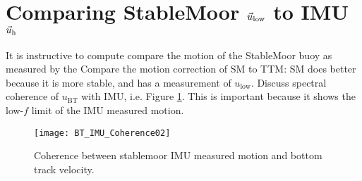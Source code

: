 \section{Comparing StableMoor $\vec{u}_\mathrm{low}$ to IMU $\vec{u}_\mathrm{h}$}
\label{apdx:ulow}

It is instructive to compute compare the motion of the StableMoor buoy as measured by the Compare the motion correction of SM to TTM: SM does better because it is more stable, and has a measurement of $u_\mathrm{low}$. Discuss spectral coherence of $u_\mathrm{BT}$ with IMU, i.e. Figure \ref{fig:SM_coh}. This is important because it shows the low-$f$ limit of the IMU measured motion.

\begin{figure}[t]
  \centering
  \texttt{[image: BT\_IMU\_Coherence02]}
  \caption{Coherence between stablemoor IMU measured motion and bottom track velocity.}
  \label{fig:SM_coh}
\end{figure}



